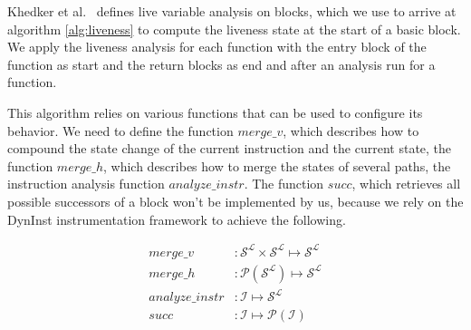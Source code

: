 Khedker et al.~ \cite{khedker2009data} defines live variable analysis on blocks, which we use to arrive at
algorithm \ref{alg:liveness} to compute the liveness state at the start of a basic block. 
We apply the liveness analysis for each function with the entry block of the function as start and the return blocks as end and after an analysis run for a function.

This algorithm relies on various functions that can be used to configure its behavior. We need to define the function
$merge\_v$, which describes how to compound the state change of the current instruction and the current state, 
the function $merge\_h$, which describes how to merge the states of several paths, the instruction analysis function
$analyze\_instr$. The function $succ$, which retrieves all possible successors of a block won't be implemented by us, 
because we rely on the DynInst instrumentation framework to achieve the following.

\begin{subequations}
\label{eq:livenesscustom}
\begin{align}
merge\_v &: \mathcal{S}^\mathcal{L} \times \mathcal{S}^\mathcal{L} \mapsto \mathcal{S}^\mathcal{L}\\
merge\_h &: \mathcal{P}(\mathcal{S}^\mathcal{L}) \mapsto \mathcal{S}^\mathcal{L}\\
analyze\_instr &: \mathcal {I} \mapsto \mathcal{S}^\mathcal{L} \\
succ &: \mathcal{I} \mapsto \mathcal{P}(\mathcal{I})
\end{align}
\end{subequations}

